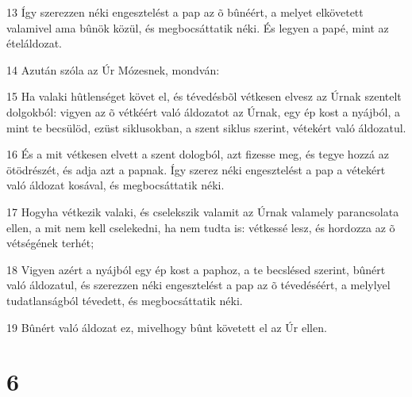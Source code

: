 \par 13 Így szerezzen néki engesztelést a pap az õ bûnéért, a melyet elkövetett valamivel ama bûnök közül, és megbocsáttatik néki. És legyen a papé, mint az ételáldozat.
\par 14 Azután szóla az Úr Mózesnek, mondván:
\par 15 Ha valaki hûtlenséget követ el, és tévedésbõl vétkesen elvesz az Úrnak szentelt dolgokból: vigyen az õ vétkéért való áldozatot az Úrnak, egy ép kost a nyájból, a mint te becsülöd, ezüst siklusokban, a szent siklus szerint, vétekért való áldozatul.
\par 16 És a mit vétkesen elvett a szent dologból, azt fizesse meg, és tegye hozzá az ötödrészét, és adja azt a papnak. Így szerez néki engesztelést a pap a vétekért való áldozat kosával, és megbocsáttatik néki.
\par 17 Hogyha vétkezik valaki, és cselekszik valamit az Úrnak valamely parancsolata ellen, a mit nem kell cselekedni, ha nem tudta is: vétkessé lesz, és hordozza az õ vétségének terhét;
\par 18 Vigyen azért a nyájból egy ép kost a paphoz, a te becslésed szerint, bûnért való áldozatul, és szerezzen néki engesztelést a pap az õ tévedéséért, a melylyel tudatlanságból tévedett, és megbocsáttatik néki.
\par 19 Bûnért való áldozat ez, mivelhogy bûnt követett el az Úr ellen.

\chapter{6}


